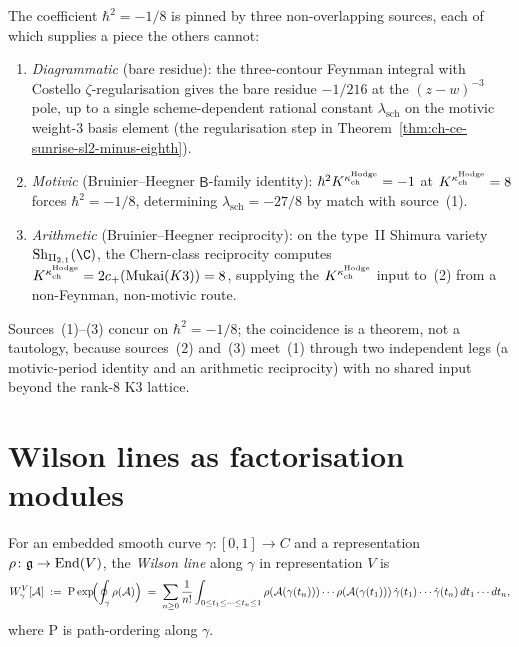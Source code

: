 \begin{remark}[Three independent sources pinning $\hbar^2 = -1/8$]
\label{rem:ch-ce-sunrise-three-paths}
%
The coefficient $\hbar^2 = -1/8$ is pinned by three non-overlapping
sources, each of which supplies a piece the others cannot:
\begin{enumerate}[label=\textup{(\arabic*)}]
\item \emph{Diagrammatic} (bare residue): the three-contour Feynman
integral with Costello $\zeta$-regularisation gives the bare residue
$-1/216$ at the $(z-w)^{-3}$ pole, up to a single scheme-dependent
rational constant $\lambda_{\mathrm{sch}}$ on the motivic
weight-$3$ basis element
(the regularisation step in
Theorem~\ref{thm:ch-ce-sunrise-sl2-minus-eighth}).
\item \emph{Motivic} (Bruinier--Heegner $\mathsf{B}$-family identity):
$\hbar^2 K^{\kappa_{\mathrm{ch}}^{\mathrm{Hodge}}} = -1$ at $K^{\kappa_{\mathrm{ch}}^{\mathrm{Hodge}}} = 8$ forces
$\hbar^2 = -1/8$, determining $\lambda_{\mathrm{sch}} = -27/8$ by
match with source~(1).
\item \emph{Arithmetic} (Bruinier--Heegner reciprocity): on the
type~II Shimura variety $\mathrm{Sh}_{\mathrm{II}_{2,1}}(\C)$, the
Chern-class reciprocity computes
\(K^{\kappa_{\mathrm{ch}}^{\mathrm{Hodge}}}=2c_+(\mathrm{Mukai}(K3))=8\), supplying the
$K^{\kappa_{\mathrm{ch}}^{\mathrm{Hodge}}}$ input to~(2) from a non-Feynman,
non-motivic route.
\end{enumerate}
Sources~(1)--(3) concur on $\hbar^2 = -1/8$; the coincidence is a
theorem, not a tautology, because sources~(2) and~(3) meet~(1) through
two independent legs (a motivic-period identity and an arithmetic
reciprocity) with no shared input beyond the rank-$8$ K3 lattice.
\end{remark}

\section{Wilson lines as factorisation modules}
\label{sec:ch-ce-wilson-line}

\begin{definition}
\label{def:wilson-line-path-ordered}
%
For an embedded smooth curve $\gamma\colon[0,1]\to C$ and a
representation $\rho\colon\mathfrak{g}\to\mathrm{End}(V)$, the \emph{Wilson line}
along $\gamma$ in representation $V$ is
\begin{equation}
\label{eq:wilson-line-path-ordered}
W^V_\gamma[\mathcal{A}]
\;:=\;
\mathrm{P}\exp\!\Bigl(\oint_\gamma \rho(\mathcal{A})\Bigr)
\;=\;
\sum_{n\ge 0}\frac{1}{n!}
\int_{0\le t_1\le\cdots\le t_n\le 1}
\rho(\mathcal{A}(\gamma(t_n)))\cdots\rho(\mathcal{A}(\gamma(t_1)))\,
\dot\gamma(t_1)\cdots\dot\gamma(t_n)\,dt_1\cdots dt_n,
\end{equation}
where $\mathrm{P}$ is path-ordering along $\gamma$.
\end{definition}

